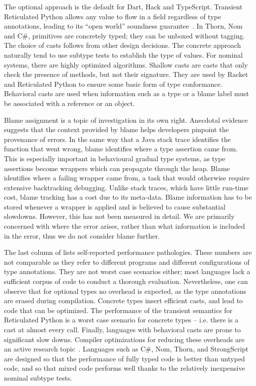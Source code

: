 \documentclass[USenglish]{tex/lipics-v2016}f
\begin{document}
The optional approach is the default for Dart, Hack and TypeScript.
Transient Reticulated Python allows any value to flow in a field regardless
of type annotations, leading to its ``open world'' soundness
guarantee~\cite{siek14}.  In Thorn, Nom and C\#, primitives are concretely
typed; they can be unboxed without tagging.  The choice of casts follows
from other design decisions. The concrete approach naturally tend to use
subtype tests to establish the type of values. For nominal systems, there
are highly optimized algorithms. Shallow casts are casts that only check the
presence of methods, but not their signature. They are used by Racket and
Reticulated Python to ensure some basic form of type conformance.  Behavioral casts are
used when information such as a type or a blame label must be associated
with a reference or an object.

Blame assignment is a topic of investigation in its own right. Anecdotal
evidence suggests that the context provided by blame helps developers
pinpoint the provenance of errors. In the same way that a Java stack trace
identifies the function that went wrong, blame identifies where a type assertion
came from. This is especially important in behavioural gradual type systems,
as type assertions become wrappers which can propagate through the heap. Blame
identifies where a failing wrapper came from, a task that would otherwise require
extensive backtracking debugging. Unlike stack traces, which have little run-time cost,
blame tracking has a cost due to its meta-data. Blame information has to be
stored whenever a wrapper is applied and is believed
to cause substantial slowdowns. However, this has not been measured in detail.
We are primarily concerned with where the error arises, rather than what information
is included in the error, thus we do not consider blame further.

The last column of  lists self-reported performance
pathologies.  These numbers are not comparable as they refer to different
programs and different configurations of type annotations. They are not
worst case scenarios either; most languages lack a sufficient corpus of code
to conduct a thorough evaluation.  Nevertheless, one can observe that for
optional types no overhead is expected, as the type annotations are erased
during compilation. Concrete types insert efficient casts, and lead to code
that can be optimized.  The performance of the transient semantics for
Reticulated Python is a worst case scenario for concrete types -- i.e. there
is a cast at almost every call. Finally, languages with behavioral casts are
prone to significant slow downs. Compiler optimizations for reducing these
overheads are an active research topic~\cite{richards-bettermono,OnlyMostly}.  
Languages such as C\#, Nom, Thorn, and Strong\-Script are designed so that
the performance of fully typed code is better than untyped code, and so that
mixed code performs well thanks to the relatively inexpensive nominal subtype tests.
\end{document}
